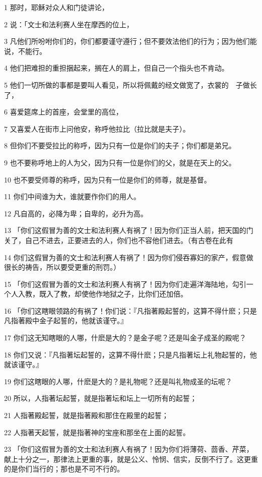\par 1 那时，耶稣对众人和门徒讲论，
\par 2 说：「文士和法利赛人坐在摩西的位上，
\par 3 凡他们所吩咐你们的，你们都要谨守遵行；但不要效法他们的行为；因为他们能说，不能行。
\par 4 他们把难担的重担捆起来，搁在人的肩上，但自己一个指头也不肯动。
\par 5 他们一切所做的事都是要叫人看见，所以将佩戴的经文做宽了，衣裳的　子做长了，
\par 6 喜爱筵席上的首座，会堂里的高位，
\par 7 又喜爱人在街市上问他安，称呼他拉比（拉比就是夫子）。
\par 8 但你们不要受拉比的称呼，因为只有一位是你们的夫子；你们都是弟兄。
\par 9 也不要称呼地上的人为父，因为只有一位是你们的父，就是在天上的父。
\par 10 也不要受师尊的称呼，因为只有一位是你们的师尊，就是基督。
\par 11 你们中间谁为大，谁就要作你们的用人。
\par 12 凡自高的，必降为卑；自卑的，必升为高。
\par 13 「你们这假冒为善的文士和法利赛人有祸了！因为你们正当人前，把天国的门关了，自己不进去，正要进去的人，你们也不容他们进去。（有古卷在此有
\par 14 你们这假冒为善的文士和法利赛人有祸了！因为你们侵吞寡妇的家产，假意做很长的祷告，所以要受更重的刑罚。）
\par 15 「你们这假冒为善的文士和法利赛人有祸了！因为你们走遍洋海陆地，勾引一个人入教，既入了教，却使他作地狱之子，比你们还加倍。
\par 16 「你们这瞎眼领路的有祸了！你们说：『凡指著殿起誓的，这算不得什麽；只是凡指著殿中金子起誓的，他就该谨守。』
\par 17 你们这无知瞎眼的人哪，什麽是大的？是金子呢？还是叫金子成圣的殿呢？
\par 18 你们又说：『凡指著坛起誓的，这算不得什麽；只是凡指著坛上礼物起誓的，他就该谨守。』
\par 19 你们这瞎眼的人哪，什麽是大的？是礼物呢？还是叫礼物成圣的坛呢？
\par 20 所以，人指著坛起誓，就是指著坛和坛上一切所有的起誓；
\par 21 人指著殿起誓，就是指著殿和那住在殿里的起誓；
\par 22 人指著天起誓，就是指著神的宝座和那坐在上面的起誓。
\par 23 「你们这假冒为善的文士和法利赛人有祸了！因为你们将薄荷、茴香、芹菜，献上十分之一，那律法上更重的事，就是公义、怜悯、信实，反倒不行了。这更重的是你们当行的；那也是不可不行的。
